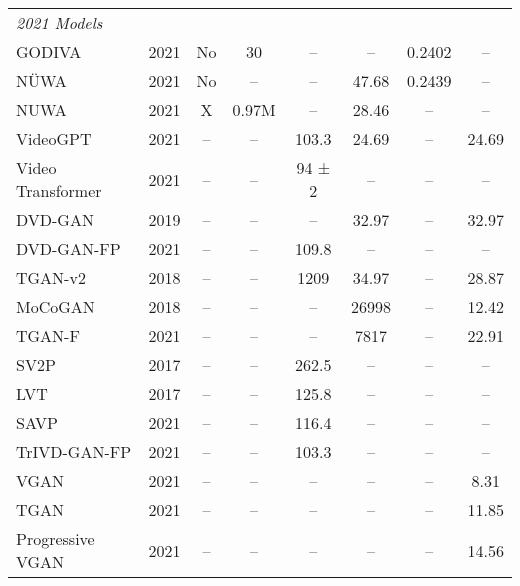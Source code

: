\begin{longtable}{lccccccc}
    \multicolumn{8}{l}{\textit{2021 Models}} \\
    GODIVA \cite{wu2021godivageneratingopendomainvideos} & 2021 & No & 30 & -- & -- & 0.2402 & -- \\
    NÜWA \cite{wu2021nuwavisualsynthesispretraining} & 2021 & No & -- & -- & 47.68 & 0.2439 & -- \\
    NUWA \cite{wu2021nuwa} & 2021 & X & 0.97M & -- & 28.46 & -- & -- \\
    VideoGPT \cite{yan2021videogptvideogenerationusing} & 2021 & -- & -- & 103.3 & 24.69 & -- & 24.69 \\
    Video Transformer \cite{arnab2021vivitvideovisiontransformer} & 2021 & -- & -- & 94 ± 2 & -- & -- & -- \\
    DVD-GAN \cite{clark2019adversarialvideogenerationcomplex} & 2019 & -- & -- & -- & 32.97 & -- & 32.97 \\
    DVD-GAN-FP \cite{luc2021transformationbasedadversarialvideoprediction} & 2021 & -- & -- & 109.8 & -- & -- & -- \\
    TGAN-v2 \cite{Saito_2020} & 2018 & -- & -- & 1209 & 34.97 & -- & 28.87 \\
    MoCoGAN \cite{tulyakov2017mocogandecomposingmotioncontent} & 2018 & -- & -- & -- & 26998 & -- & 12.42 \\
    TGAN-F \cite{saito2017temporalgenerativeadversarialnets} & 2021 & -- & -- & -- & 7817 & -- & 22.91 \\
    SV2P \cite{babaeizadeh2018stochasticvariationalvideoprediction} & 2017 & -- & -- & 262.5 & -- & -- & -- \\
    LVT \cite{huang2021lvt} & 2017 & -- & -- & 125.8 & -- & -- & -- \\
    SAVP \cite{lee2018savp} & 2021 & -- & -- & 116.4 & -- & -- & -- \\
    TrIVD-GAN-FP \cite{clark2021dvdgan} & 2021 & -- & -- & 103.3 & -- & -- & -- \\
    VGAN \cite{vondrick2016vgan} & 2021 & -- & -- & -- & -- & -- & 8.31 \\
    TGAN \cite{saito2017tgan} & 2021 & -- & -- & -- & -- & -- & 11.85 \\
    Progressive VGAN \cite{vondrick2016vgan} & 2021 & -- & -- & -- & -- & -- & 14.56 \\
    

\end{longtable}
